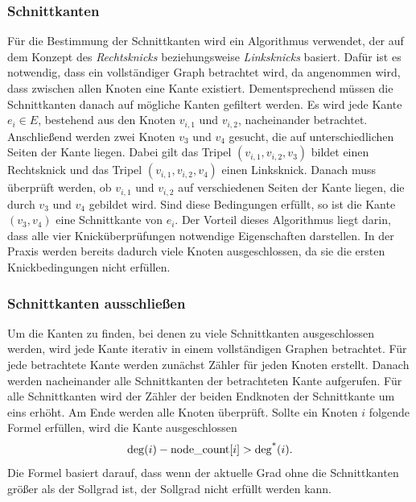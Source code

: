 \subsubsection{Schnittkanten}
\label{sec:intersection_edges}
Für die Bestimmung der Schnittkanten wird ein Algorithmus verwendet, der auf dem Konzept des \emph{Rechtsknicks} beziehungsweise \emph{Linksknicks} basiert.
Dafür ist es notwendig, dass ein vollständiger Graph betrachtet wird, da angenommen wird, dass zwischen allen Knoten eine Kante existiert.
Dementsprechend müssen die Schnittkanten danach auf mögliche Kanten gefiltert werden.
Es wird jede Kante \(e_i \in E\), bestehend aus den Knoten \(v_{i,1}\) und \(v_{i,2}\), nacheinander betrachtet.
Anschließend werden zwei Knoten \(v_3\) und \(v_4\) gesucht, die auf unterschiedlichen Seiten der Kante liegen.
Dabei gilt das Tripel \((v_{i,1}, v_{i,2}, v_3)\) bildet einen Rechtsknick und das Tripel \((v_{i,1}, v_{i,2}, v_4)\) einen Linksknick.
Danach muss überprüft werden, ob \(v_{i,1}\) und \(v_{i,2}\) auf verschiedenen Seiten der Kante liegen, die durch \(v_3\) und \(v_4\) gebildet wird.
Sind diese Bedingungen erfüllt, so ist die Kante \((v_3, v_4)\) eine Schnittkante von \(e_i\).
Der Vorteil dieses Algorithmus liegt darin, dass alle vier Knicküberprüfungen notwendige Eigenschaften darstellen.
In der Praxis werden bereits dadurch viele Knoten ausgeschlossen, da sie die ersten Knickbedingungen nicht erfüllen.





\subsubsection{Schnittkanten ausschließen}
Um die Kanten zu finden, bei denen zu viele Schnittkanten ausgeschlossen werden, wird jede Kante iterativ in einem vollständigen Graphen betrachtet.
Für jede betrachtete Kante werden zunächst Zähler für jeden Knoten erstellt.
Danach werden nacheinander alle Schnittkanten der betrachteten Kante aufgerufen.
Für alle Schnittkanten wird der Zähler der beiden Endknoten der Schnittkante um eins erhöht.
Am Ende werden alle Knoten überprüft.
Sollte ein Knoten \(i\) folgende Formel erfüllen, wird die Kante ausgeschlossen
\[
\operatorname{deg}(i) - \text{node\_count}[i] > \operatorname{deg^*}(i).
\]
Die Formel basiert darauf, dass wenn der aktuelle Grad ohne die Schnittkanten größer als der Sollgrad ist, der Sollgrad nicht erfüllt werden kann.



